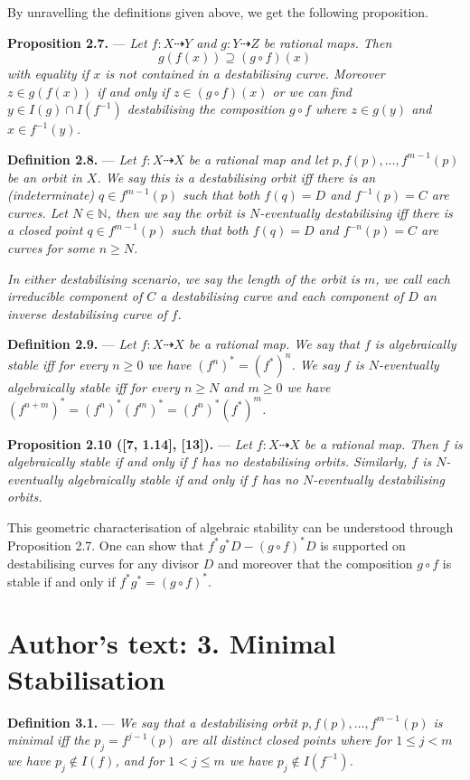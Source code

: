 \documentclass[11pt]{article}
\newcommand{\rat}{\dashrightarrow}
\newcommand{\sourcestatement}[2]{\par\medskip\noindent\textbf{#1.} --- \textit{#2}\par}
\begin{document}
By unravelling the definitions given above, we get the following proposition.

\sourcestatement{Proposition 2.7}{Let $f:X\rat Y$ and $g:Y\rat Z$ be
rational maps. Then
\[
 g(f(x))\supseteq(g\circ f)(x)
\]
with equality if $x$ is not contained in a destabilising curve. Moreover
$z\in g(f(x))$ if and only if $z\in(g\circ f)(x)$ or we can find
$y\in I(g)\cap I(f^{-1})$ destabilising the composition $g\circ f$ where
$z\in g(y)$ and $x\in f^{-1}(y)$.}

\sourcestatement{Definition 2.8}{Let $f:X\rat X$ be a rational map and
let $p,f(p),\ldots,f^{m-1}(p)$ be an orbit in $X$. We say this is a
destabilising orbit iff there is an (indeterminate) $q\in f^{m-1}(p)$ such
that both $f(q)=D$ and $f^{-1}(p)=C$ are curves. Let $N\in\mathbb N$, then
we say the orbit is $N$-eventually destabilising iff there is a closed point
$q\in f^{m-1}(p)$ such that both $f(q)=D$ and $f^{-n}(p)=C$ are curves
for some $n\geq N$.}
\textit{In either destabilising scenario, we say the length of the orbit is
$m$, we call each irreducible component of $C$ a destabilising curve and
each component of $D$ an inverse destabilising curve of $f$.}

\sourcestatement{Definition 2.9}{Let $f:X\rat X$ be a rational map. We
say that $f$ is algebraically stable iff for every $n\geq0$ we have
$(f^n)^*=(f^*)^n$. We say $f$ is $N$-eventually algebraically stable iff
for every $n\geq N$ and $m\geq0$ we have
$(f^{n+m})^*=(f^n)^*(f^m)^*=(f^n)^*(f^*)^m$.}

\sourcestatement{Proposition 2.10 ([7, 1.14], [13])}{Let $f:X\rat X$ be
a rational map. Then $f$ is algebraically stable if and only if $f$ has
no destabilising orbits. Similarly, $f$ is $N$-eventually algebraically
stable if and only if $f$ has no $N$-eventually destabilising orbits.}

This geometric characterisation of algebraic stability can be understood
through Proposition 2.7. One can show that $f^*g^*D-(g\circ f)^*D$ is
supported on destabilising curves for any divisor $D$ and moreover that
the composition $g\circ f$ is stable if and only if $f^*g^*=(g\circ f)^*$.

\section*{Author's text: 3. Minimal Stabilisation}
\sourcestatement{Definition 3.1}{We say that a destabilising orbit
$p,f(p),\ldots,f^{m-1}(p)$ is minimal iff the $p_j=f^{j-1}(p)$ are all
distinct closed points where for $1\leq j<m$ we have $p_j\notin I(f)$,
and for $1<j\leq m$ we have $p_j\notin I(f^{-1})$.}
\end{document}
